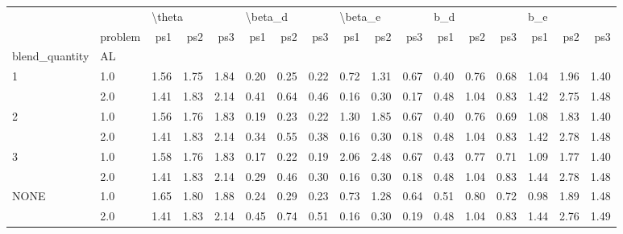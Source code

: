 \begin{tabular}{llrrrrrrrrrrrrrrr}
\toprule
     & {} & \multicolumn{3}{l}{\textbackslash theta} & \multicolumn{3}{l}{\textbackslash beta\_d} & \multicolumn{3}{l}{\textbackslash beta\_e} & \multicolumn{3}{l}{b\_d} & \multicolumn{3}{l}{b\_e} \\
     & problem &    ps1 &  ps2 &  ps3 &     ps1 &  ps2 &  ps3 &     ps1 &  ps2 &  ps3 &  ps1 &  ps2 &  ps3 &  ps1 &  ps2 &  ps3 \\
blend\_quantity & AL &        &      &      &         &      &      &         &      &      &      &      &      &      &      &      \\
\midrule
1 & 1.0 &   1.56 & 1.75 & 1.84 &    0.20 & 0.25 & 0.22 &    0.72 & 1.31 & 0.67 & 0.40 & 0.76 & 0.68 & 1.04 & 1.96 & 1.40 \\
     & 2.0 &   1.41 & 1.83 & 2.14 &    0.41 & 0.64 & 0.46 &    0.16 & 0.30 & 0.17 & 0.48 & 1.04 & 0.83 & 1.42 & 2.75 & 1.48 \\
2 & 1.0 &   1.56 & 1.76 & 1.83 &    0.19 & 0.23 & 0.22 &    1.30 & 1.85 & 0.67 & 0.40 & 0.76 & 0.69 & 1.08 & 1.83 & 1.40 \\
     & 2.0 &   1.41 & 1.83 & 2.14 &    0.34 & 0.55 & 0.38 &    0.16 & 0.30 & 0.18 & 0.48 & 1.04 & 0.83 & 1.42 & 2.78 & 1.48 \\
3 & 1.0 &   1.58 & 1.76 & 1.83 &    0.17 & 0.22 & 0.19 &    2.06 & 2.48 & 0.67 & 0.43 & 0.77 & 0.71 & 1.09 & 1.77 & 1.40 \\
     & 2.0 &   1.41 & 1.83 & 2.14 &    0.29 & 0.46 & 0.30 &    0.16 & 0.30 & 0.18 & 0.48 & 1.04 & 0.83 & 1.44 & 2.78 & 1.48 \\
NONE & 1.0 &   1.65 & 1.80 & 1.88 &    0.24 & 0.29 & 0.23 &    0.73 & 1.28 & 0.64 & 0.51 & 0.80 & 0.72 & 0.98 & 1.89 & 1.48 \\
     & 2.0 &   1.41 & 1.83 & 2.14 &    0.45 & 0.74 & 0.51 &    0.16 & 0.30 & 0.19 & 0.48 & 1.04 & 0.83 & 1.44 & 2.76 & 1.49 \\
\bottomrule
\end{tabular}
